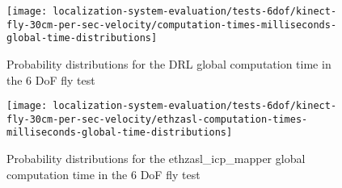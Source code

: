 \begin{figure}[H]
	\centering
	\texttt{[image: localization-system-evaluation/tests-6dof/kinect-fly-30cm-per-sec-velocity/computation-times-milliseconds-global-time-distributions]}
	\caption{Probability distributions for the DRL global computation time in the 6 DoF fly test}
	\label{fig:localization-system-evaluation_kinect-fly-30cm-per-sec-velocity-computation-time}
\end{figure}

\begin{figure}[H]
	\centering
	\texttt{[image: localization-system-evaluation/tests-6dof/kinect-fly-30cm-per-sec-velocity/ethzasl-computation-times-milliseconds-global-time-distributions]}
	\caption{Probability distributions for the ethzasl\_icp\_mapper global computation time in the 6 DoF fly test}
	\label{fig:localization-system-evaluation_kinect-fly-30cm-per-sec-velocity-computation-time-asl}
\end{figure}


%
%
%
%

